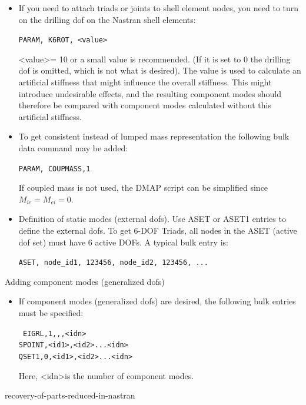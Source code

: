 {\begin{itemize}
\item If you need to attach triads or joints to shell element nodes,
  you need to turn on the drilling dof on the Nastran shell elements:

  \texttt{PARAM, K6ROT, \textless value\textgreater}

  \textless value\textgreater = 10 or a small value is recommended.
  (If it is set to 0 the drilling dof is omitted, which is not what is desired).
  The value is used to calculate an artificial stiffness that might influence
  the overall stiffness. This might introduce undesirable effects,
  and the resulting component modes should therefore be compared with component
  modes calculated without this artificial stiffness.

\item To get consistent instead of lumped mass representation
  the following bulk data command may be added:

  \texttt{PARAM, COUPMASS,1}

  If coupled mass is not used, the DMAP script can be simplified since
  $M_{ie} = M_{ei} = 0$.

\item Definition of static modes (external dofs).
  Use ASET or ASET1 entries to define the external dofs. To get 6-DOF Triads,
  all nodes in the ASET (active dof set) must have 6 active DOFs.
  A typical bulk entry is:

  \texttt{ASET, node\_id1, 123456, node\_id2, 123456, ...}
\end{itemize}

Adding component modes (generalized dofs)

\begin{itemize}
\item If component modes (generalized dofs) are desired,
  the following bulk entries must be specified:

  \texttt{%
  EIGRL,1,,,\textless idn\textgreater \\
  SPOINT,\textless id1\textgreater,\textless id2\textgreater...\textless idn\textgreater \\
  QSET1,0,\textless id1\textgreater,\textless id2\textgreater...\textless idn\textgreater}

  Here, \textless idn\textgreater is the number of component modes.
\end{itemize}


           {recovery-of-parts-reduced-in-nastran}

}

